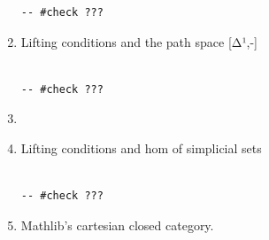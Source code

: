 \documentclass{book}
\theoremstyle{definition}
\newcounter{lcounter}
\begin{document}
\begin{enumerate}
\begin{center}
\begin{tcolorbox}[width=5in,colback={white},title={\begin{center}\texttt{Lean \thelcounter} \addtocounter{lcounter}{1}  \end{center}},colbacktitle=Blue,coltitle=black]
\begin{verbatim}
-- #check ???

\end{verbatim}
\end{tcolorbox}
\end{center}

\item Lifting conditions and the path space [Δ¹,-]

\begin{center}
\begin{tcolorbox}[width=5in,colback={white},title={\begin{center}\texttt{Lean \thelcounter} \addtocounter{lcounter}{1}  \end{center}},colbacktitle=Blue,coltitle=black]
\begin{verbatim}

-- #check ???

\end{verbatim}
\end{tcolorbox}
\end{center}

\item 

\item Lifting conditions and hom of simplicial sets

\begin{center}
\begin{tcolorbox}[width=5in,colback={white},title={\begin{center}\texttt{Lean \thelcounter} \addtocounter{lcounter}{1}  \end{center}},colbacktitle=Blue,coltitle=black]
\begin{verbatim}

-- #check ???

\end{verbatim}
\end{tcolorbox}
\end{center}

\item Mathlib's cartesian closed category.

\begin{center}
\begin{tcolorbox}[width=5in,colback={white},title={\begin{center}\texttt{Lean \thelcounter} \addtocounter{lcounter}{1}  \end{center}},colbacktitle=Blue,coltitle=black]
\begin{verbatim}


\end{verbatim}
\end{tcolorbox}
\end{center}
\end{enumerate}
\end{document}
